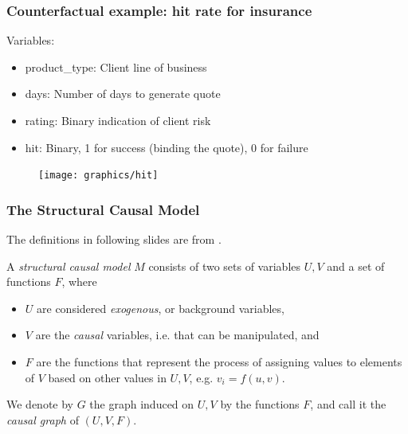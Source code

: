 \begin{frame}
    \frametitle{Counterfactual example: hit rate for insurance}
    Variables:
    \begin{itemize}
    \item product\_type: Client line of business
    \item days: Number of days to generate quote
    \item rating: Binary indication of client risk
    \item hit: Binary, 1 for success (binding the quote), 0 for failure\newline
    \end{itemize}
    
    \begin{figure}[ht]
    \texttt{[image: graphics/hit]}
    \end{figure}
\end{frame}


\begin{frame}
    \frametitle{The Structural Causal Model}
    The definitions in following slides are from \cite{pearl2007mathematics}.

    A \emph{structural causal model} $M$ consists of two sets of variables $U, V$ and a set of functions $F$, where 
    
    \begin{itemize}
        \item $U$ are considered \emph{exogenous}, or background variables, 
        \item $V$ are the \emph{causal} variables, i.e. that can be manipulated, and
        \item $F$ are the functions that represent the process of assigning values to elements of $V$ based on other values in $U, V$, e.g. $v_i = f(u, v)$.
    \end{itemize}

    We denote by $G$ the graph induced on $U, V$ by the functions $F$, and call it the \emph{causal graph} of $(U, V, F)$.
\end{frame}

